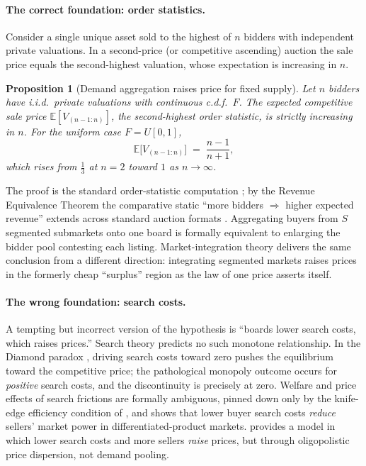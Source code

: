 \documentclass[11pt]{article}
\newtheorem{proposition}{Proposition}
\begin{document}
\paragraph{The correct foundation: order statistics.}
Consider a single unique asset sold to the highest of $n$ bidders with independent private
valuations. In a second-price (or competitive ascending) auction the sale price equals the
second-highest valuation, whose expectation is increasing in $n$.

\begin{proposition}[Demand aggregation raises price for fixed supply]\label{prop:os}
Let $n$ bidders have i.i.d.\ private valuations with continuous c.d.f.\ $F$. The expected
competitive sale price $\mathbb{E}[V_{(n-1:n)}]$, the second-highest order statistic, is
strictly increasing in $n$. For the uniform case $F=U[0,1]$,
\[
\mathbb{E}\big[V_{(n-1:n)}\big] \;=\; \frac{n-1}{n+1},
\]
which rises from $\tfrac13$ at $n=2$ toward $1$ as $n\to\infty$.
\end{proposition}

\noindent The proof is the standard order-statistic computation \citep{easleykleinberg2010}; by the
Revenue Equivalence Theorem the comparative static ``more bidders $\Rightarrow$ higher expected
revenue'' extends across standard auction formats \citep{vickrey1961,rileysamuelson1981,myerson1981}.
Aggregating buyers from $S$ segmented submarkets onto one board is formally equivalent to enlarging
the bidder pool contesting each listing. Market-integration theory delivers the same conclusion from
a different direction: integrating segmented markets raises prices in the formerly cheap ``surplus''
region as the law of one price asserts itself.

\paragraph{The wrong foundation: search costs.}
A tempting but incorrect version of the hypothesis is ``boards lower search costs, which raises
prices.'' Search theory predicts no such monotone relationship. In the Diamond paradox
\citep{diamond1971}, driving search costs toward zero pushes the equilibrium toward the competitive
price; the pathological monopoly outcome occurs for \emph{positive} search costs, and the
discontinuity is precisely at zero. Welfare and price effects of search frictions are formally
ambiguous, pinned down only by the knife-edge efficiency condition of \citet{hosios1990}, and
\citet{bakos1997} shows that lower buyer search costs \emph{reduce} sellers' market power in
differentiated-product markets. \citet{stahl1989} provides a model in which lower search costs and
more sellers \emph{raise} prices, but through oligopolistic price dispersion, not demand pooling.
\end{document}
